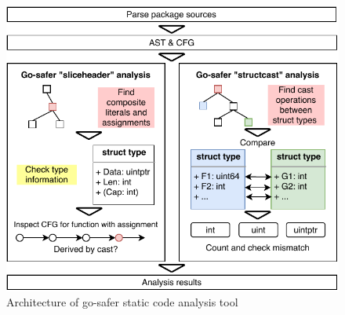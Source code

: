 \begin{figure}[t!] %
    \centering
    \includegraphics[width=\textwidth]{assets/figures/chapter5/go-safer-architecture.pdf}
    \caption{Architecture of go-safer static code analysis tool}
    \label{fig:safer-architecture}
\end{figure}
